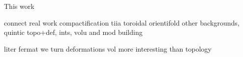 This work 

connect real work
compactification
tiia 
toroidal orientifold
other backgrounds, quintic
topo+def, ints, volu and mod building

liter fermat
we turn deformations
vol more interesting than topology


